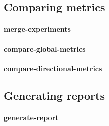 \subsection{Comparing metrics}

\paragraph{merge-experiments}

\paragraph{compare-global-metrics}
\paragraph{compare-directional-metrics}

\subsection{Generating reports}

\paragraph{generate-report}
